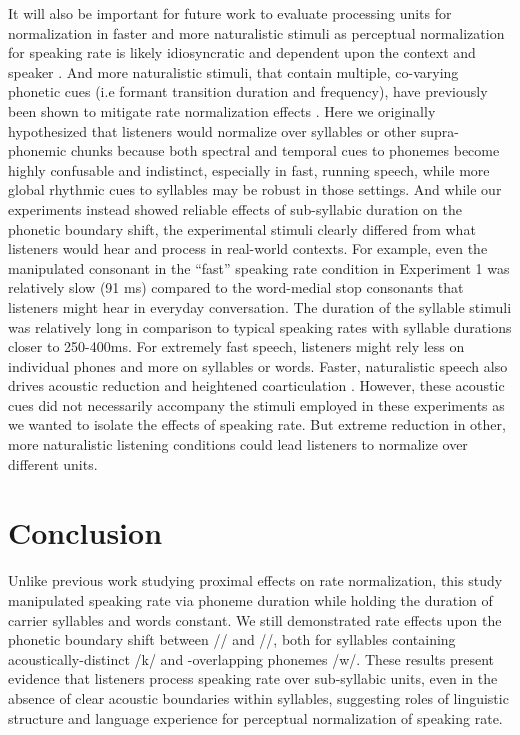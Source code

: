 \documentclass[preprint]{JASA}
\begin{document}
It will also be important for future work to evaluate processing units for normalization in faster and more naturalistic stimuli as perceptual normalization for speaking rate is likely idiosyncratic and dependent upon the context and speaker \citep{goldingerPuzzlesolvingScienceQuixotic2003}. And more naturalistic stimuli, that contain multiple, co-varying phonetic cues (i.e formant transition duration and frequency), have previously been shown to mitigate rate normalization effects \citep{shinnLimitationsContextConditioned1985}. Here we originally hypothesized that listeners would normalize over syllables or other supra-phonemic chunks because both spectral and temporal cues to phonemes become highly confusable and indistinct, especially in fast, running speech, while more global rhythmic cues to syllables may be robust in those settings. And while our experiments instead showed reliable effects of sub-syllabic duration on the phonetic boundary shift, the experimental stimuli clearly differed from what listeners would hear and process in real-world contexts. For example, even the manipulated consonant in the ``fast'' speaking rate condition in Experiment 1 was relatively slow (91 ms) compared to the word-medial stop consonants that listeners might hear in everyday conversation. The duration of the syllable stimuli was relatively long in comparison to typical speaking rates with syllable durations closer to 250-400ms. For extremely fast speech, listeners might rely less on individual phones and more on syllables or words. Faster, naturalistic speech also drives acoustic reduction and heightened coarticulation \citep{fourakisTempoStressVowel1991,gayMechanismsControlSpeech1981}. However, these acoustic cues did not necessarily accompany the stimuli employed in these experiments as we wanted to isolate the effects of speaking rate. But extreme reduction in other, more naturalistic listening conditions could lead listeners to normalize over different units. 

\section{Conclusion}

Unlike previous work studying proximal effects on rate normalization, this study manipulated speaking rate via phoneme duration while holding the duration of carrier syllables and words constant. We still demonstrated rate effects upon the phonetic boundary shift between /\textesh/ and /\textteshlig/, both for syllables containing acoustically-distinct /k\textscripta/ and -overlapping phonemes /w\textsci/. These results present evidence that listeners process speaking rate over sub-syllabic units, even in the absence of clear acoustic boundaries within syllables, suggesting roles of linguistic structure and language experience for perceptual normalization of speaking rate.  
\end{document}
